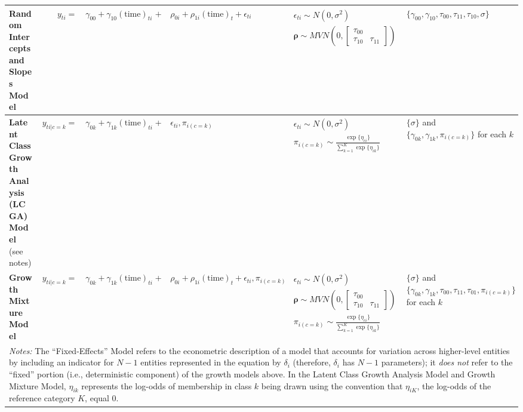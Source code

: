 \documentclass{memoir}
\begin{document}
\begin{sidewaystable*}
\begin{tabular}{p{1.5in}rrclll}
\raggedright\textbf{Random Intercepts and Slopes Model} & 
    $y_{ti} =$&
    $\gamma_{00} + \gamma_{10}(\text{time})_{ti} $&$+$&
    $\rho_{0i}  + \rho_{1i}(\text{time})_{t} + \epsilon_{ti}$ &
    $\begin{array}{l}\epsilon_{ti} \sim N(0, \sigma^2) \\ \mathbf{\rho} \sim MVN\left(0, \begin{bmatrix}\tau_{00} & \\ \tau_{10} & \tau_{11}\end{bmatrix}\right)\end{array}$ &
    $\{\gamma_{00}, \gamma_{10}, \tau_{00}, \tau_{11}, \tau_{10}, \sigma\}$ \\\midrule

\raggedright\textbf{Latent Class Growth Analysis (LCGA) Model} (see notes)&
    $y_{ti|c=k} =$&
    $\gamma_{0k} + \gamma_{1k}(\text{time})_{ti}$ &+&
    $\epsilon_{ti}, \pi_{i(c=k)}$ & 
    $\begin{array}{l}\epsilon_{ti} \sim N(0, \sigma^2) \\ \pi_{i(c=k)} \sim \frac{\exp\{\eta_{ci}\}}{\sum^K_{k=1}\exp\{\eta_{ik}\}}\end{array}$ &
    \multicolumn{1}{l}{\parbox[c]{1.75in}{\raggedright$\{\sigma\}$ and \\ $\{\gamma_{0k}, \gamma_{1k}, \pi_{i(c=k)}\}$ for each $k$}}\\\midrule

\raggedright\textbf{Growth Mixture Model}&
    $y_{ti|c=k} =$&
    $\gamma_{0k} + \gamma_{1k}(\text{time})_{ti}$ &+&
    $\rho_{0i}  + \rho_{1i}(\text{time})_{t} + \epsilon_{ti}, \pi_{i(c=k)}$ & 
    $\begin{array}{l}\epsilon_{ti} \sim N(0, \sigma^2) \\ \mathbf{\rho} \sim MVN\left(0, \begin{bmatrix}\tau_{00} & \\ \tau_{10} & \tau_{11}\end{bmatrix}\right)\\ \pi_{i(c=k)} \sim \frac{\exp\{\eta_{ci}\}}{\sum^K_{k=1}\exp\{\eta_{ik}\}}\end{array}$ &
    \multicolumn{1}{l}{\parbox[c]{1.75in}{\raggedright$\{\sigma\}$ and \\ $\{\gamma_{0k}, \gamma_{1k}, \tau_{00}, \tau_{11}, \tau_{01}, \pi_{i(c=k)}\}$ for each $k$}}\\\bottomrule


\multicolumn{7}{p{\textwidth}}{\footnotesize
    \emph{Notes:} The ``Fixed-Effects'' Model refers to the econometric description of a model that accounts for variation across higher-level entities by including an indicator for $N{-}1$ entities represented in the equation by $\delta_i$ (therefore, $\delta_i$ has $N{-}1$ parameters); it \emph{does not} refer to the ``fixed'' portion (i.e., deterministic component) of the growth models above. In the Latent Class Growth Analysis Model and Growth Mixture Model, $\eta_{ik}$ represents the log-odds of membership in class $k$ being drawn using the convention that $\eta_{iK}$, the log-odds of the reference category $K$, equal 0.
}
\end{tabular}
\end{sidewaystable*}
\end{document}
